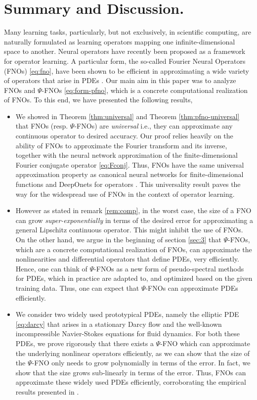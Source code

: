 \documentclass[reqno,a4paper]{amsart}
\begin{document}
\section{Summary and Discussion.}
\label{sec:5}
Many learning tasks, particularly, but not exclusively, in scientific computing, are naturally formulated as learning operators mapping one infinite-dimensional space to another. Neural operators have recently been proposed as a framework for operator learning. A particular form, the so-called Fourier Neural Operators (FNOs) \eqref{eq:fno}, have been shown to be efficient in approximating a wide variety of operators that arise in PDEs \cite{fourierop2020}. Our main aim in this paper was to analyze FNOs and $\Psi$-FNOs \eqref{eq:form-pfno}, which is a concrete computational realization of FNOs. To this end, we have presented the following results,
\begin{itemize}
    \item We showed in Theorem \ref{thm:universal} and Theorem \ref{thm:pfno-universal} that FNOs (resp. $\Psi$-FNOs) are \emph{universal} i.e., they can approximate any continuous operator to desired accuracy. Our proof relies heavily on the ability of FNOs to approximate the Fourier transform and its inverse, together with the neural network approximation of the finite-dimensional Fourier conjugate operator \eqref{eq:Fconj}. Thus, FNOs have the same universal approximation property as canonical neural networks for finite-dimensional functions and DeepOnets for operators \cite{LMK2021}. This universality result paves the way for the widespread use of FNOs in the context of operator learning.
    \item However as stated in remark \ref{rem:comp}, in the worst case, the size of a FNO can grow \emph{super-exponentially} in terms of the desired error for approximating a general Lipschitz continuous operator. This might inhibit the use of FNOs. On the other hand, we argue in the beginning of section \ref{sec:3} that $\Psi$-FNOs, which are a concrete computational realization of FNOs, can approximate the nonlinearities and differential operators that define PDEs, very efficiently. Hence, one can think of $\Psi$-FNOs as a new form of pseudo-spectral methods for PDEs, which in practice are adapted to, and optimized based on the given training data. Thus, one can expect that $\Psi$-FNOs can approximate PDEs efficiently. 
    \item We consider two widely used prototypical PDEs, namely the elliptic PDE \eqref{eq:darcy} that arises in a stationary Darcy flow and the well-known incompressible Navier-Stokes equations for fluid dynamics. For both these PDEs, we prove rigorously that there exists a $\Psi$-FNO which can approximate the underlying nonlinear operators efficiently, as we can show that the size of the $\Psi$-FNO only needs to grow polynomially in terms of the error. In fact, we show that the size grows sub-linearly in terms of the error. Thus, FNOs can approximate these widely used PDEs efficiently, corroborating the empirical results presented in \cite{fourierop2020}. 
\end{itemize}
\end{document}
